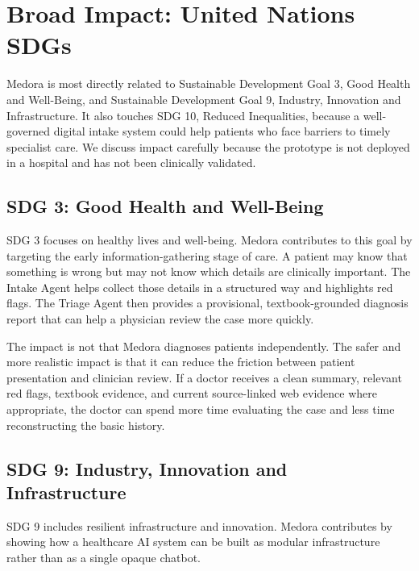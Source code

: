 
\chapter{Broad Impact: United Nations SDGs}
\label{chapter:Broad_Impact}

Medora is most directly related to Sustainable Development Goal 3, Good Health and Well-Being, and Sustainable Development Goal 9, Industry, Innovation and Infrastructure. It also touches SDG 10, Reduced Inequalities, because a well-governed digital intake system could help patients who face barriers to timely specialist care. We discuss impact carefully because the prototype is not deployed in a hospital and has not been clinically validated.

\section{SDG 3: Good Health and Well-Being}

SDG 3 focuses on healthy lives and well-being. Medora contributes to this goal by targeting the early information-gathering stage of care. A patient may know that something is wrong but may not know which details are clinically important. The Intake Agent helps collect those details in a structured way and highlights red flags. The Triage Agent then provides a provisional, textbook-grounded diagnosis report that can help a physician review the case more quickly.

The impact is not that Medora diagnoses patients independently. The safer and more realistic impact is that it can reduce the friction between patient presentation and clinician review. If a doctor receives a clean summary, relevant red flags, textbook evidence, and current source-linked web evidence where appropriate, the doctor can spend more time evaluating the case and less time reconstructing the basic history.

\section{SDG 9: Industry, Innovation and Infrastructure}

SDG 9 includes resilient infrastructure and innovation. Medora contributes by showing how a healthcare AI system can be built as modular infrastructure rather than as a single opaque chatbot.

